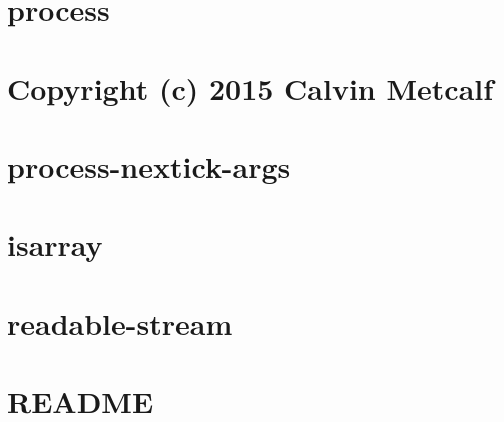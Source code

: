 \documentclass[twoside]{book}
\newcommand{\+}{\discretionary{\mbox{\scriptsize$\hookleftarrow$}}{}{}}
\begin{document}
\chapter{process}
\label{md_dsmacc_examples_DRmerge_node_modules_process_README}

\chapter{Copyright (c) 2015 Calvin Metcalf}
\label{md_dsmacc_examples_DRmerge_node_modules_process-nextick-args_license}

\chapter{process-\/nextick-\/args}
\label{md_dsmacc_examples_DRmerge_node_modules_process-nextick-args_readme}

\chapter{isarray}
\label{md_dsmacc_examples_DRmerge_node_modules_progress-stream_node_modules_isarray_README}

\chapter{readable-\/stream}
\label{md_dsmacc_examples_DRmerge_node_modules_progress-stream_node_modules_readable-stream_README}

\chapter{R\+E\+A\+D\+ME}
\label{md_dsmacc_examples_DRmerge_node_modules_progress-stream_node_modules_string_decoder_README}

\end{document}
